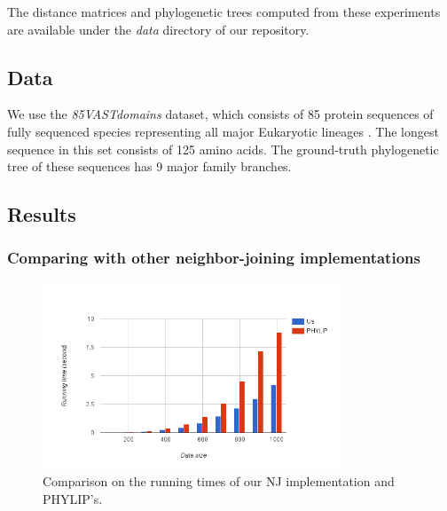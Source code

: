 \documentclass[11pt,letterpaper]{article}
\theoremstyle{definition}
\begin{document}



The distance matrices and phylogenetic trees computed from these experiments are available under the \textit{data} directory of our repository. 

\subsection{Data}

We use the \textit{85VASTdomains} dataset, which consists of 85 protein sequences of fully sequenced species representing all major Eukaryotic lineages \cite{khafif2014identification}. The longest sequence in this set consists of 125 amino acids. The ground-truth phylogenetic tree of these sequences has 9 major family branches.

\subsection{Results}

\subsubsection{Comparing with other neighbor-joining implementations}

\begin{figure}[t]
  \centering
  \includegraphics[width=0.8\textwidth]{runningtime.png}
  \caption{Comparison on the running times of our NJ implementation and PHYLIP's.}
  \label{fig:runningtime}
\end{figure}
\end{document}
